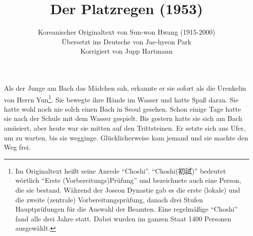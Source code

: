 \documentclass[prd,12pt,tightenlines,notitlepage,nofootinbib]{revtex4-1}
\begin{document}
\title{Der Platzregen (1953)}
\author{Koreanischer Originaltext von Sun-won Hwang (1915-2000)
\\ Übersetzt ins Deutsche von Jae-hyeon Park
\\ Korrigiert von Jupp Hartmann}
\maketitle

\noindent
Als der Junge am Bach das Mädchen sah, erkannte er sie sofort als die
Urenkelin von Herrn Yun\footnote{Im Originaltext heißt seine Anrede "`Choshi"'.
"`Choshi({初試})"' bedeutet wörtlich "`Erste (Vorbereitungs)Prüfung"' und
bezeichnete auch eine Person, die sie bestand.
Während der Joseon Dynastie gab es
die erste (lokale) und die zweite (zentrale) Vorbereitungsprüfung,
danach drei Stufen Hauptprüfungen für die Auswahl der Beamten.
Eine regelmäßige "`Choshi"' fand alle drei Jahre statt. Dabei wurden
im ganzen Staat 1400 Personen ausgewählt.}.
Sie bewegte ihre Hände im Wasser und hatte
Spaß daran.  Sie hatte wohl noch nie solch einen Bach in Seoul gesehen.
Schon einige Tage hatte sie nach der Schule mit dem Wasser gespielt.
Bis gestern hatte sie sich am Bach amüsiert,
aber heute war sie mitten auf den Trittsteinen.  Er
setzte sich ans Ufer, um zu warten, bis sie wegginge.  Glücklicherweise kam
jemand und sie machte den Weg frei.
\end{document}

